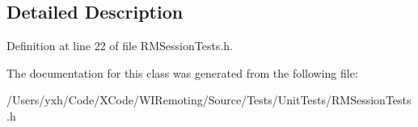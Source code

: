 \subsection{Detailed Description}


Definition at line 22 of file RMSessionTests.h.

The documentation for this class was generated from the following file:\begin{DoxyCompactItemize}
\item 
/Users/yxh/Code/XCode/WIRemoting/Source/Tests/UnitTests/RMSessionTests.h\end{DoxyCompactItemize}
